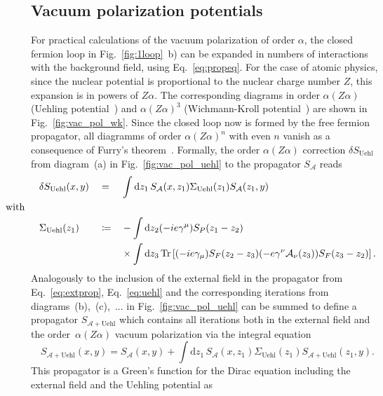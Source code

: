 \subsection{Vacuum polarization potentials}
\label{sec:vacPolTheory}
For practical calculations of the vacuum polarization of order $\alpha$, the closed fermion loop in Fig.~\ref{fig:1loop}~b) can be expanded in numbers of interactions with the background field, using Eq.~\ref{eq:propeq}. For the case of atomic physics, since the nuclear potential is proportional to the nuclear charge number $Z$, this expansion is in powers of $Z\alpha$. The corresponding diagrams in order $\alpha(Z\alpha)$ (Uehling potential~\cite{uehling1935}) and $\alpha(Z\alpha)^3$ (Wichmann-Kroll potential~\cite{wichmann1956}) are shown in Fig.~\ref{fig:vac_pol_wk}. Since the closed loop now is formed by the free fermion propagator, all diagramms of order $\alpha(Z\alpha)^n$ with even $n$ vanish as a consequence of Furry's theorem~\mbox{\cite[Section~10.1.]{peskin1995}}. Formally, the order $\alpha (Z\alpha)$ correction $\delta S_{\text{Uehl}}$ from diagram~(a) in Fig.~\ref{fig:vac_pol_uehl} to the propagator $S_{\mathcal{A}}$ reads
\begin{alignat}{3}
\label{eq:uehl}
&\delta S_{\text{Uehl}}(x,y) &&=&& \int \mathrm{d}z_1\,S_{\mathcal{A}}(x,z_1)\Sigma_{\text{Uehl}}(z_1)S_{\mathcal{A}}(z_1,y)\\
&\hspace{-1.2cm}\text{with}\notag\\
&\Sigma_{\text{Uehl}}(z_1) &&\coloneqq&& -\int\mathrm{d}z_2(-ie\gamma^\mu)S_P(z_1-z_2)\notag\\
&&&&&\times\int\mathrm{d}z_3\,\Tr\left[(-ie\gamma_\mu)S_F(z_2-z_3)(-e\gamma^\nu \mathcal{A}_\nu (z_3))S_F(z_3-z_2)\right].\notag
\end{alignat}
Analogously to the inclusion of the external field in the propagator from Eq.~\eqref{eq:extprop}, Eq.~\eqref{eq:uehl} and the corresponding iterations from diagrams~(b),~(c),~... in Fig.~\ref{fig:vac_pol_uehl} can be summed to define a propagator $S_{\mathcal{A}+\text{Uehl}}$ which contains all iterations both in the external field and the order~$\alpha (Z\alpha)$ vacuum polarization via the integral equation
\begin{equation}
S_{\mathcal{A}+\text{Uehl}}(x,y) = S_{\mathcal{A}}(x,y) +  \int \mathrm{d}z_1\,S_{\mathcal{A}}(x,z_1)\Sigma_{\text{Uehl}}(z_1)S_{\mathcal{A}+\text{Uehl}}(z_1,y).
\label{eq:uehlsum}
\end{equation}
This propagator is a Green's function for the Dirac equation including the external field and the Uehling potential as
